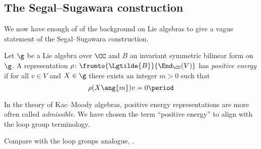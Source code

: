 
\subsection{The Segal--Sugawara construction}\label{sec:SegalSugawara}

We now have enough of of the background on Lie algebras to give a vague statement of the Segal--Sugawara construction.

\begin{definition}\label{def:posenergy}
	Let $ \g $ be a Lie algebra over $ \CC $ and $ B $ an invariant symmetric bilinear form on $ \g $.
	A representation $ \rho \colon \fromto{\Lgtilde{B}}{\End_{\CC}(V)} $ has \textit{positive energy} if for all $
	v \in V $ and $ X \in \g $ there exists an integer $ m > 0 $ such that
	\begin{equation*}
		\rho(X\ang{m})v = 0 \period
	\end{equation*}
\end{definition}

\begin{remark}
	In the theory of Kac--Moody algebras, positive energy representations are more often called \textit{admissible}.
	We have chosen the term ``positive energy'' to align with the loop group
	terminology.
\end{remark}
Compare with the loop groups analogue, .

